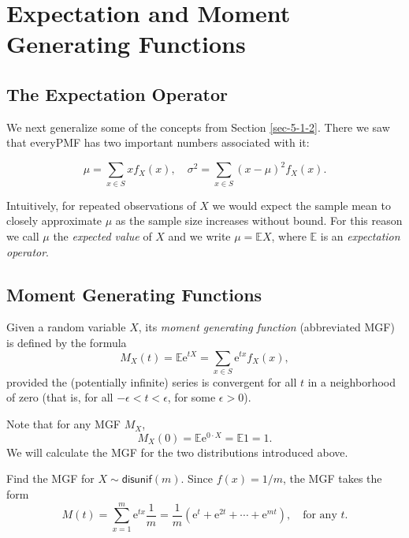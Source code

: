 \section{Expectation and Moment Generating Functions}
\label{sec-5-4}

\subsection{The Expectation Operator}
\label{sec-5-4-1}

We next generalize some of the concepts from Section
\ref{sec-5-1-2}. There we saw that everyPMF has
two important numbers associated with it:

\begin{equation}
\mu = \sum_{x \in S}x f_{X}(x),\quad \sigma^{2} = \sum_{x \in S}(x - \mu)^{2} f_{X}(x).
\end{equation}

Intuitively, for repeated observations of \(X\) we would expect the
sample mean to closely approximate \(\mu\) as the sample size
increases without bound. For this reason we call \(\mu\) the \emph{expected
value} of \(X\) and we write \(\mu=\mathbb{E} X\), where
\(\mathbb{E}\) is an \emph{expectation operator}.

\subsection{Moment Generating Functions}
\label{sec-5-4-2}

\begin{defn}
Given a random variable \(X\), its \emph{moment generating function}
(abbreviated MGF) is defined by the formula
\begin{equation}
M_{X}(t)=\mathbb{E}\mathrm{e}^{tX}=\sum_{x\in S}\mathrm{e}^{tx}f_{X}(x),
\end{equation}
provided the (potentially infinite) series is convergent for all \(t\)
in a neighborhood of zero (that is, for all \(-\epsilon < t <
\epsilon\), for some \(\epsilon > 0\)).
\end{defn}

Note that for any MGF \(M_{X}\),
\begin{equation}
M_{X}(0) = \mathbb{E} \mathrm{e}^{0 \cdot X} = \mathbb{E} 1 = 1.
\end{equation}
We will calculate the MGF for the two distributions introduced above.


Find the MGF for \(X\sim\mathsf{disunif}(m)\). Since \(f(x) = 1/m\),
the MGF takes the form \[ M(t) = \sum_{x = 1}^{m} \mathrm{e}^{tx}
\frac{1}{m} = \frac{1}{m}(\mathrm{e}^{t} + \mathrm{e}^{2t} + \cdots +
\mathrm{e}^{mt}),\quad \mbox{for any $t$.}  \]



